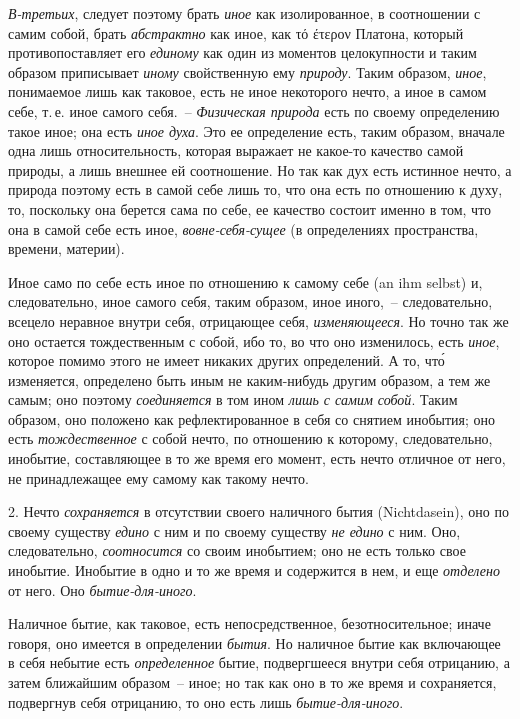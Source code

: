 \emph{В-третьих}, следует поэтому брать \emph{иное} как изолированное,
в соотношении с самим собой, брать \emph{абстрактно}
как иное, как τό έτερον Платона, который противопоставляет
его \emph{единому} как один из моментов целокупности
и таким образом приписывает \emph{иному} свойственную ему
\emph{природу}. Таким образом, \emph{иное}, понимаемое лишь как таковое,
есть не иное некоторого нечто, а иное в самом
себе, т.\,е. иное самого себя.~-- \emph{Физическая природа} есть
по своему определению такое иное; она есть \emph{иное духа}.
Это ее определение есть, таким образом, вначале одна
лишь относительность, которая выражает не какое-то
качество самой природы, а лишь внешнее ей соотношение.
Но так как дух есть истинное нечто, а природа
поэтому есть в самой себе лишь то, что она есть по отношению
к духу, то, поскольку она берется сама по себе,
ее качество состоит именно в том, что она в самой себе
есть иное, \emph{вовне-себя-сущее} (в определениях пространства,
времени, материи).

Иное само по себе есть иное по отношению к самому
себе (an ihm selbst) и, следовательно, иное самого себя,
таким образом, иное иного,~-- следовательно, всецело неравное
внутри себя, отрицающее себя, \emph{изменяющееся}.
Но точно так же оно остается тождественным с собой,
ибо то, во что оно изменилось, есть \emph{иное}, которое помимо
этого не имеет никаких других определений. А то, чт\'о
изменяется, определено быть иным не каким-нибудь
другим образом, а тем же самым; оно поэтому \emph{соединяется}
в том ином \emph{лишь с самим собой}. Таким образом, оно
положено как рефлектированное в себя со снятием инобытия;
оно есть \emph{тождественное} с собой нечто, по отношению
к которому, следовательно, инобытие, составляющее
в то же время его момент, есть нечто отличное от него,
не принадлежащее ему самому как такому нечто.

2. Нечто \emph{сохраняется} в отсутствии своего наличного
бытия (Nichtdasein), оно по своему существу \emph{едино} с ним
и по своему существу \emph{не едино} с ним. Оно, следовательно,
\emph{соотносится} со своим инобытием; оно не есть только
свое инобытие. Инобытие в одно и то же время и содержится
в нем, и еще \emph{отделено} от него. Оно \emph{бытие-для-иного}.

Наличное бытие, как таковое, есть непосредственное,
безотносительное; иначе говоря, оно имеется в определении
\emph{бытия}. Но наличное бытие как включающее в себя
небытие есть \emph{определенное} бытие, подвергшееся внутри
себя отрицанию, а затем ближайшим образом~-- иное; но
так как оно в то же время и сохраняется, подвергнув себя
отрицанию, то оно есть лишь \emph{бытие-для-иного}.


